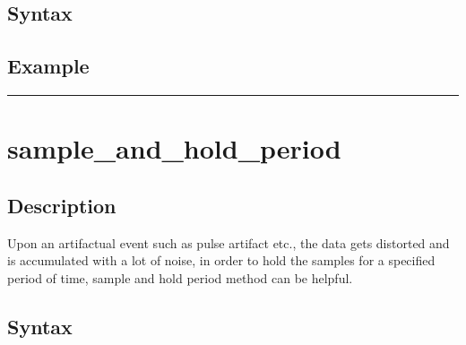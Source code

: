 \documentclass[letterpaper,10pt,english]{sphinxmanual}
\begin{document}
\subsection{Syntax}
\label{\detokenize{4_api_documentation:id45}}
\begin{sphinxVerbatim}[commandchars=\\\{\}]
\end{sphinxVerbatim}


\subsection{Example}
\label{\detokenize{4_api_documentation:id46}}
\begin{sphinxVerbatim}[commandchars=\\\{\}]
\end{sphinxVerbatim}


\bigskip\hrule\bigskip



\section{sample\_and\_hold\_period}
\label{\detokenize{4_api_documentation:sample-and-hold-period}}

\subsection{Description}
\label{\detokenize{4_api_documentation:id47}}
\sphinxAtStartPar
Upon an artifactual event such as pulse artifact etc., the data gets distorted and is accumulated with a lot of noise, in order to hold the samples for a specified period of time, sample and hold period method can be helpful.


\subsection{Syntax}
\label{\detokenize{4_api_documentation:id48}}
\begin{sphinxVerbatim}[commandchars=\\\{\}]
\PYG{p}{[}\PYG{p}{]}
\end{sphinxVerbatim}
\end{document}
